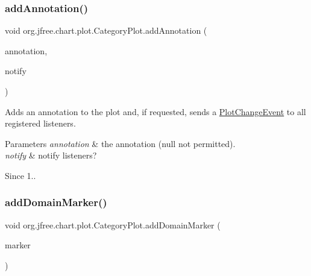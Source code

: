 \subsubsection{\texorpdfstring{add\+Annotation()}{addAnnotation()}\hspace{0.1cm}{\footnotesize\ttfamily [2/2]}}
{\footnotesize\ttfamily void org.\+jfree.\+chart.\+plot.\+Category\+Plot.\+add\+Annotation (\begin{DoxyParamCaption}\item[{\mbox{\hyperlink{interfaceorg_1_1jfree_1_1chart_1_1annotations_1_1_category_annotation}{Category\+Annotation}}}]{annotation,  }\item[{boolean}]{notify }\end{DoxyParamCaption})}

Adds an annotation to the plot and, if requested, sends a \mbox{\hyperlink{}{Plot\+Change\+Event}} to all registered listeners.


\begin{DoxyParams}{Parameters}
{\em annotation} & the annotation ({\ttfamily null} not permitted). \\
\hline
{\em notify} & notify listeners?\\
\hline
\end{DoxyParams}
\begin{DoxySince}{Since}
1.. 
\end{DoxySince}
\mbox{\label{classorg_1_1jfree_1_1chart_1_1plot_1_1_category_plot_a2fb7552beaad280581bcd911d984d956}} 
\subsubsection{\texorpdfstring{add\+Domain\+Marker()}{addDomainMarker()}\hspace{0.1cm}{\footnotesize\ttfamily [1/4]}}
{\footnotesize\ttfamily void org.\+jfree.\+chart.\+plot.\+Category\+Plot.\+add\+Domain\+Marker (\begin{DoxyParamCaption}\item[{\mbox{\hyperlink{classorg_1_1jfree_1_1chart_1_1plot_1_1_category_marker}{Category\+Marker}}}]{marker }\end{DoxyParamCaption})}

